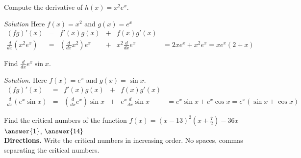 \documentclass{ximera}
\begin{document}
\begin{example} \rm{Compute the derivative of \(h(x)=x^2 e^x\). }\label{productRule-1-ex01}\end{example}

\textit{Solution} Here \(f(x)=x^2\) and \(g(x)=e^x\)
\[\begin{array}{cccccc}
 (f g)'(x) & = & f'(x) g(x) & + & f(x) g'(x) &   \\
 \displaystyle \frac{d}{d x}\left(x^2 e^x\right) & = & \displaystyle  \left(\frac{d}{d x}x^2\right)e^x & + & \displaystyle  x^2\frac{d}{d x}e^x & =2x e^x+x^2e^x=x e^x(2+x)
\end{array}\]

\begin{example} \rm{ Find \(\displaystyle \frac{d}{d x} e^x\sin  x\).}\label{productRule-1-ex02}\end{example} 

\noindent \textit{Solution. }  Here \(f(x)=e^x\) and \(g(x)=\sin  x\).
\[\begin{array}{cccccc}
 (f g)'(x) & = & f'(x) g(x) & + & f(x) g'(x) &   \\
 \displaystyle  \frac{d}{d x}\left( e^x\sin  x\right)  & = & \displaystyle  \left(\frac{d}{d x}e^x\right)\sin  x & + &  \displaystyle e^x\frac{d}{d x}\sin  x & \displaystyle  =e^x\sin  x+e^x\cos  x=e^x(\sin
 x+\cos  x) 
\end{array}\]

 
 
\begin{problem}Find the critical numbers of the function \(\displaystyle f(x) = (x-13)^2\left(x+\frac{7}{2}\right)-36x\) \\ $\answer{1}$,  $\answer{14}$\\ \textbf{Directions.} Write the critical numbers in increasing order. No spaces, commas separating the critical numbers.\end{problem} 
\end{document}
